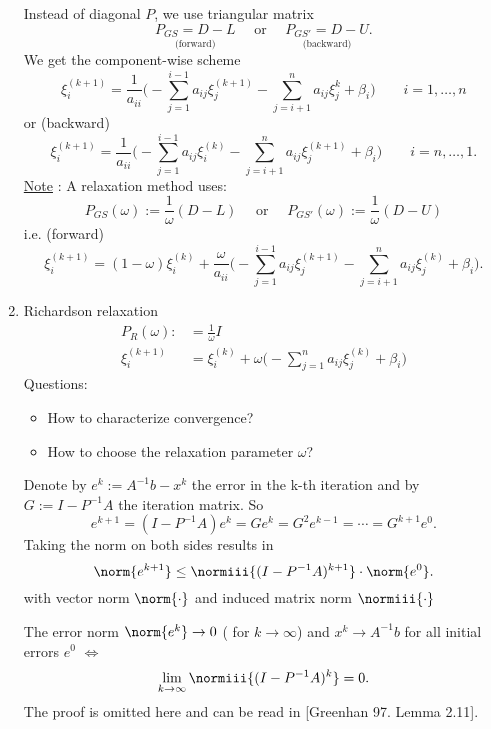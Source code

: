 \begin{enumerate}[label=\Alph{enumi})]
		Instead of diagonal $P$, we use triangular matrix
		\[
			\underset{\text{ (forward) }}{P_{GS} = D-L} \quad\text{ or }\quad \underset{\text{ (backward) }}{P_{GS'}=D-U}
		.\] 
		We get the component-wise scheme
		\[
			\xi _{i}^{(k+1)}=\frac{1}{a_{ii}} \Big( -\sum_{j=1}^{i-1}{a_{ij}} \xi _{j}^{(k+1)}-\sum_{j=i+1}^{n}{a_{ij}\xi _{j}^{k}} + \beta _{i} \Big) \qquad i=1, \ldots, n
		\] 
		or (backward)
		\[
			\xi _{i}^{(k+1)} = \frac{1}{a_{ii}} \Big( -\sum_{j=1}^{i-1}{a_{ij}\xi _{i}^{(k)}}-\sum_{j=i+1}^{n}{a_{ij}\xi _{j}^{(k+1)}} + \beta _{i} \Big) \qquad i=n, \ldots ,1
		.\] 
		\underline{Note} : A relaxation method uses:
		\[
			P_{GS}(\omega ) := \frac{1}{\omega }(D-L) \quad \text{ or } \quad P_{GS'}(\omega ) := \frac{1}{\omega }(D-U)
		\] 
		i.e. (forward)
		\[
			\xi _{i}^{(k+1)} = (1-\omega )\xi _{i}^{(k)} + \frac{\omega }{a_{ii}} \Big( -\sum_{j=1}^{i-1}{a_{ij}\xi _{j}^{(k+1)}} - \sum_{j=i+1}^{n}{a_{ij}\xi _{j}^{(k)}} + \beta _{i} \Big) 
		.\] 
	\item Richardson relaxation
		\begin{align*}
			P_{R}(\omega ) :&= \frac{1}{\omega } I \\
			\xi _{i}^{(k+1)} &= \xi _{i}^{(k)} + \omega \Big( -\sum_{j=1}^{n}{a_{ij}\xi _{j}^{(k)}} + \beta _{i} \Big) 
		\end{align*}
		Questions:
		\begin{itemize}
			\item How to characterize convergence?
			\item How to choose the relaxation parameter $\omega $?
		\end{itemize}

		Denote by $e^{k} := A^{-1}b - x^{k}$ the error in the k-th iteration and by $G:=I-P^{-1}A$ the iteration matrix. So
		\[
			e^{k+1}= (I-P^{-1}A)e^{k} = Ge^{k} = G^{2}e^{k-1} = \cdots = G^{k+1}e^{0}
		.\] 
		Taking the norm on both sides results in
		\[
			\norm{e^{k+1}}  \leq \normiii{(I-P^{-1}A)^{k+1}} \cdot \norm{e^{0}} 
		.\] 
		with vector norm $\norm{\cdot} $ and induced matrix norm $\normiii{\cdot}$
		\begin{lemma}
		\label{thm:richardconvergencelemma}
		The error norm $\norm{e^{k}} \rightarrow 0$ ( for $k \rightarrow \infty$) and $x^{k} \rightarrow A^{-1}b$ for all initial errors $e^{0}$ $\iff$
		\[
			\lim_{k \to \infty} \normiii{(I-P^{-1}A)^{k}} = 0
		.\] 
		The proof is omitted here and can be read in 
		[Greenhan 97. Lemma 2.11].
		\end{lemma}


\end{enumerate}
